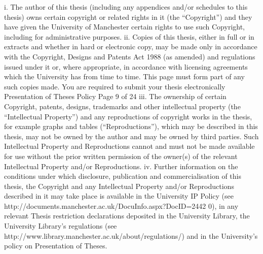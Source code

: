 i. The author of this thesis (including any appendices and/or schedules to this thesis) owns certain copyright or related rights in it (the “Copyright”) and they have given the University of Manchester certain rights to use such Copyright, including for administrative purposes.
ii. Copies of this thesis, either in full or in extracts and whether in hard or electronic copy, may be made only in accordance with the Copyright, Designs and Patents Act 1988 (as amended) and regulations issued under it or, where appropriate, in accordance with licensing agreements which the University has from time to time. This page must form part of any such copies made.
You are required to submit your thesis electronically
Presentation of Theses Policy
 Page 9 of 24
iii. The ownership of certain Copyright, patents, designs, trademarks and other intellectual property (the “Intellectual Property”) and any reproductions of copyright works in the thesis, for example graphs and tables (“Reproductions”), which may be described in this thesis, may not be owned by the author and may be owned by third parties. Such Intellectual Property and Reproductions cannot and must not be made available for use without the prior written permission of the owner(s) of the relevant Intellectual Property and/or Reproductions.
iv. Further information on the conditions under which disclosure, publication and commercialisation of this thesis, the Copyright and any Intellectual Property and/or Reproductions described in it may take place is available in the University IP Policy (see http://documents.manchester.ac.uk/DocuInfo.aspx?DocID=2442 0), in any relevant Thesis restriction declarations deposited in the University Library, the University Library’s regulations (see http://www.library.manchester.ac.uk/about/regulations/) and in the University’s policy on Presentation of Theses.